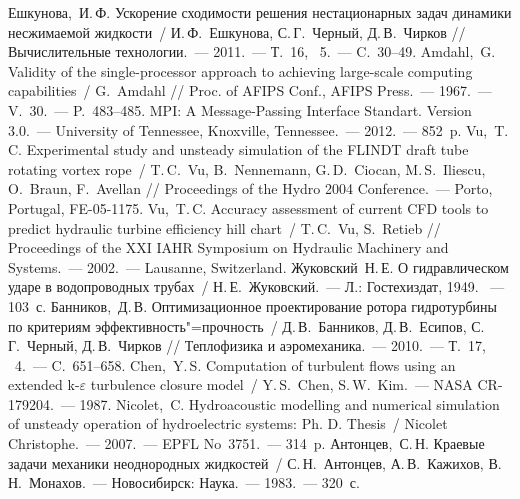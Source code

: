 \begin{thebibliography}{999}
%
\Rus
{}Ешкунова,~И.\,Ф. Ускорение сходимости решения нестационарных 
                  задач динамики несжимаемой жидкости~/ И.\,Ф.~Ешкунова, С.\,Г.~Черный, Д.\,В.~Чирков // 
                  Вычислительные технологии.~--- 2011.~--- Т.~16, \No~5.~--- C.~30--49.
%
\Eng
{} Amdahl,~G. Validity of the single-processor approach to achieving 
                large-scale computing capabilities~/ G.~Amdahl // 
                Proc. of AFIPS Conf., AFIPS Press.~--- 1967.~--- V.~30.~--- P.~483--485.                
%
\Eng
{} MPI: A Message-Passing Interface Standart. Version 3.0.~--- University 
              of Tennessee, Knoxville, Tennessee.~--- 2012.~--- 852~p.                
%
\Eng
{}Vu,~T.\,C. Experimental study and unsteady simulation of the FLINDT draft tube rotating 
                vortex rope~/ T.\,C.~Vu, B.~Nennemann, G.\,D.~Ciocan, M.\,S.~Iliescu, O.~Braun, F.~Avellan // 
                Proceedings of the Hydro 2004 Conference.~--- Porto, Portugal, FE-05-1175.
%
\Eng
{}    Vu,~T.\,C. Accuracy assessment of current CFD tools to predict hydraulic turbine 
                efficiency hill chart~/ T.\,C.~Vu, S.~Retieb // Proceedings of the XXI IAHR Symposium on 
                Hydraulic Machinery and Systems.~--- 2002.~--- Lausanne, Switzerland.
%
\Rus
{} Жуковский~Н.\,Е. О гидравлическом ударе в водопроводных трубах~/ Н.\,Е.~Жуковский.~--- 
                    Л.: Гостехиздат, 1949. ~--- 103~с.
%
\Rus
{} Банников,~Д.\,В. Оптимизационное проектирование ротора гидротурбины по критериям 
                   эффективность"=прочность~/ Д.\,В.~Банников, Д.\,В.~Есипов, С.\,Г.~Черный, Д.\,В.~Чирков // 
                   Теплофизика и аэромеханика.~--- 2010.~--- Т.~17, \No~4.~--- C.~651--658.
%
\Eng
{} Chen,~Y.\,S. Computation of turbulent flows using an extended k-$\varepsilon$
                  turbulence closure model~/ Y.\,S.~Chen, S.\,W.~Kim.~--- NASA CR-179204.~--- 1987.
%
\Eng
{} Nicolet,~C. Hydroacoustic modelling and numerical simulation of unsteady operation of 
                  hydroelectric systems: Ph. D. Thesis~/ Nicolet Christophe.~--- 2007.~--- EPFL No~3751.~--- 
                  314~p.
%
\Rus
{} Антонцев,~С.\,Н. Краевые задачи механики неоднородных жидкостей~/ С.\,Н.~Антонцев, 
                    А.\,В.~Кажихов, В.\,Н.~Монахов.~--- Новосибирск: Наука.~--- 1983.~--- 320~с.

\end{thebibliography}
